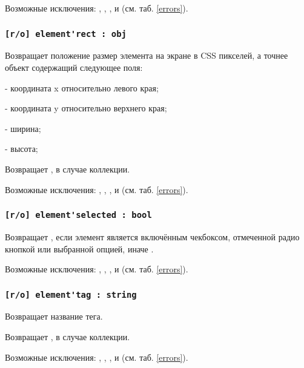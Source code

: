 Возможные исключения: , , ,  и  (см. таб. \ref{errors}).

\subsubsection{\lstinline|[r/o] element'rect : obj|}

Возвращает положение размер элемента на экране в CSS пикселей, а точнее объект содержащий следующее поля:
\begin{icItems}
	\item {} - координата x относительно левого края;
	\item {} - координата y относительно верхнего края;
	\item {} - ширина;
	\item {} - высота;
\end{icItems}

\code{[icL]} Возвращает \set, в случае коллекции.

Возможные исключения: , , ,  и  (см. таб. \ref{errors}).

\subsubsection{\lstinline|[r/o] element'selected : bool|}

Возвращает \true, если элемент является включённым чекбоксом, отмеченной радио кнопкой или выбранной опцией, иначе \false.

Возможные исключения: , , ,  и  (см. таб. \ref{errors}).

\subsubsection{\lstinline|[r/o] element'tag : string|}

Возвращает название тега.

\code{[icL]} Возвращает \listtype, в случае коллекции.

Возможные исключения: , , ,  и  (см. таб. \ref{errors}).

